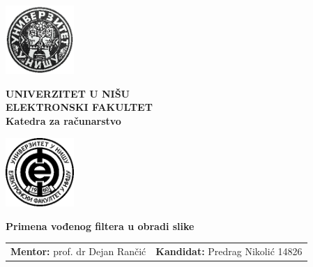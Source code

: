 \documentclass[a4paper,12pt,titlepage]{article}
\begin{document}
\begin{titlepage}
    \begin{center}
    
        \includegraphics[width=2.6cm]{img/uni.png}%
        \begin{minipage}[b]{0.7\textwidth}
            \centering
            \Large
            \textbf{UNIVERZITET U NIŠU\\ ELEKTRONSKI FAKULTET\\}       
            \large
            \textbf{Katedra za računarstvo}
        \end{minipage}%
        \includegraphics[width=2.6cm]{img/elfak.png}
        
              
      
        \vspace{5cm}
        \Large
        \textbf{Primena vođenog filtera u obradi slike}
        
        \vspace{0.6cm}
        \normalsize
    \end{center}
    
    \vspace{1cm}
   
    
    
    
    \vspace{10cm}
    
    \noindent \begin{tabu} to 
        \textbf{Mentor:} prof. dr Dejan Rančić &
        \textbf{Kandidat:} Predrag Nikolić 14826
    \end{tabu}
    

\end{titlepage}
\end{document}
